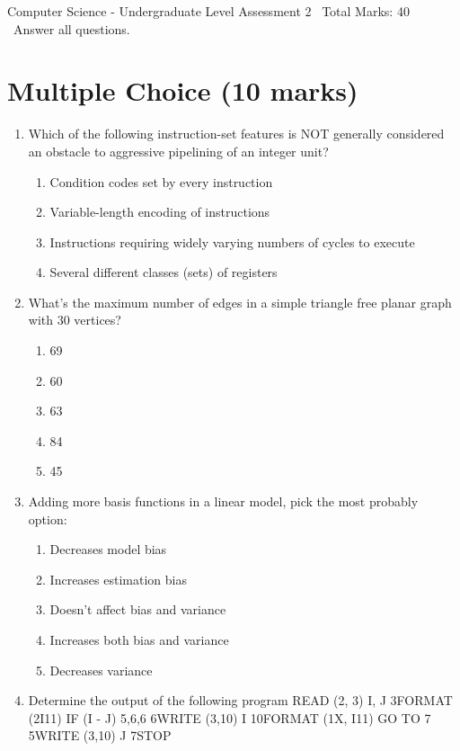 \documentclass[12pt]{article}
\begin{document}
\begin{center}
Computer Science - Undergraduate Level Assessment 2 \
Total Marks: 40 \
Answer all questions.
\end{center}

\section*{Multiple Choice (10 marks)}
\begin{enumerate}[label=\arabic*.]
\item Which of the following instruction-set features is NOT generally considered an obstacle to
aggressive pipelining of an integer unit?
\begin{enumerate}[label=(\alph*)]
    \item Condition codes set by every instruction
    \item Variable-length encoding of instructions
    \item Instructions requiring widely varying numbers of cycles to execute
    \item Several different classes (sets) of registers
\end{enumerate}
\item What's the maximum number of edges in a simple triangle free planar graph with 30
vertices?
\begin{enumerate}[label=(\alph*)]
    \item 69
    \item 60
    \item 63
    \item 84
    \item 45
\end{enumerate}
\item Adding more basis functions in a linear model, pick the most probably option:
\begin{enumerate}[label=(\alph*)]
    \item Decreases model bias
    \item Increases estimation bias
    \item Doesn't affect bias and variance
    \item Increases both bias and variance
    \item Decreases variance
\end{enumerate}
\item Determine the output of the following program READ (2, 3) I, J 3FORMAT (2I11) IF (I - J)
5,6,6 6WRITE (3,10) I 10FORMAT (1X, I11) GO TO 7 5WRITE (3,10) J 7STOP
\begin{enumerate}[label=(\alph*)]

\end{enumerate}
\end{enumerate}
\end{document}
